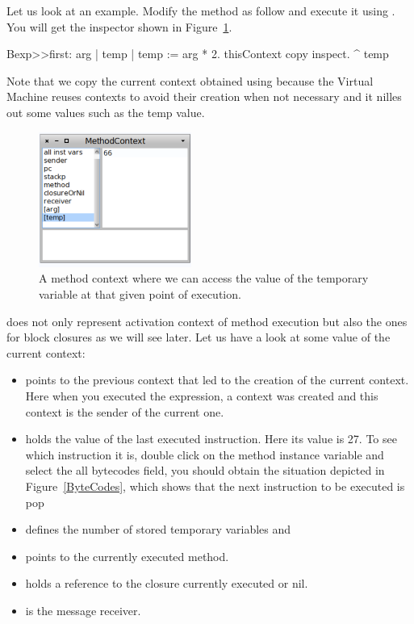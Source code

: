\documentclass[a4paper,10pt,twoside]{book}
\begin{document}
Let us look at an example. Modify the method as follow and execute it using .
You will get the inspector shown in Figure~\ref{oneContext}.

\begin{code}
Bexp>>first: arg
	| temp |
	temp := arg * 2.
	thisContext copy inspect.
	^ temp
\end{code}

Note that we copy the current context obtained using  because the Virtual Machine reuses contexts to avoid their creation when not necessary and it nilles out some values such as the temp value.

\begin{figure}[!h]
\begin{center}\includegraphics[width=5cm]{OneContext}
\caption{A method context where we can access the value of the temporary variable  at that given point of execution.\label{oneContext}}
\end{center}
\end{figure}

 does not only represent activation context of method execution but also
the ones for block closures as we will see later. Let us have a look at some value of the current context:

\begin{itemize}
\item {} points to the previous context that led to the creation of the current context. Here when you executed the expression, a context was created and this context is the sender of the current one.

\item {} holds the value of the last executed instruction. Here its value is 27. To see which instruction it is, double click on the method instance variable and select the all bytecodes field, you should obtain the situation depicted in Figure~\ref{ByteCodes}, which shows that the next instruction to be executed is pop 

\item {} defines the number of stored temporary variables and 

\item {} points to the currently executed method.

\item {} holds a reference to the closure currently executed or nil.

\item {} is the message receiver.
\end{itemize}
\end{document}
